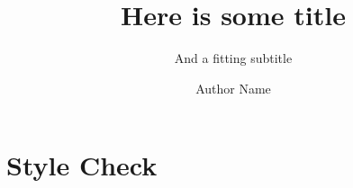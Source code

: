\documentclass{tudelft-report}
\begin{document}
\frontmatter
\title{Here is some title}
\subtitle{And a fitting subtitle}
\author{Author Name}
\subject{Subject} %
\makecover


\tableofcontents

\mainmatter
{}
\chapter{Style Check}
\label{ch:Style}
\newpage


\nochapterimage
\printbibliography
\end{document}
